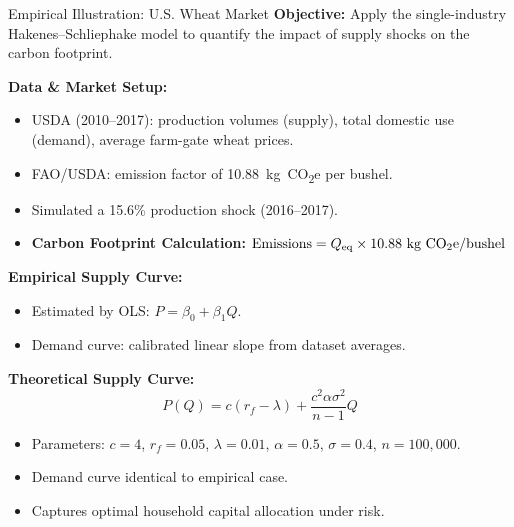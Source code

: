 \documentclass{beamer}
\begin{document}
\begin{frame}{Empirical Illustration: U.S. Wheat Market}
\footnotesize
\vspace{-2.5em}
\textbf{Objective:} Apply the single-industry Hakenes--Schliephake model to quantify the impact of supply shocks on the carbon footprint.

\vspace{0.5em}
\textbf{Data \& Market Setup:}
\begin{itemize}
  \item USDA (2010--2017): production volumes (supply), total domestic use (demand), average farm-gate wheat prices.
  \item FAO/USDA: emission factor of 10.88~kg~CO\textsubscript{2}e per bushel.
\item Simulated a 15.6\% production shock (2016–2017).
\item \textbf{Carbon Footprint Calculation: }$
\text{Emissions} = Q_{\text{eq}} \times 10.88 \text{ kg CO\textsubscript{2}e/bushel}
$

\end{itemize}


\textbf{Empirical Supply Curve:}
\begin{itemize}
  \item Estimated by OLS: \( P = \beta_0 + \beta_1 Q \).
  \item Demand curve: calibrated linear slope from dataset averages.
  
\end{itemize}

\textbf{Theoretical Supply Curve:}
\[
P(Q) = c(r_f - \lambda) + \frac{c^2 \alpha \sigma^2}{n - 1} Q
\]
\begin{itemize}
  \item Parameters: \(c = 4\), \(r_f = 0.05\), \(\lambda = 0.01\), \(\alpha = 0.5\), \(\sigma = 0.4\), \(n = 100{,}000\).
  \item Demand curve identical to empirical case.
  \item Captures optimal household capital allocation under risk.
\end{itemize}
\end{frame}

\end{document}

